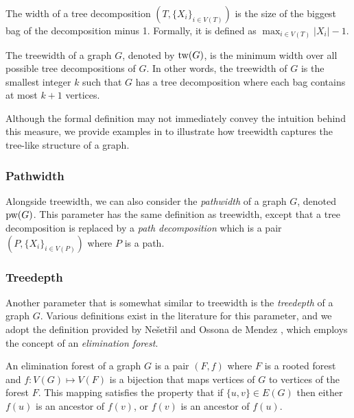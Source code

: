\begin{definition}
    The width of a tree decomposition $(T,\{X_i\}_{i \in V(T)})$ is the size of the biggest bag of the decomposition minus 1. Formally, it is defined as $\max_{i \in V(T)} |X_i| - 1$.
\end{definition}

\begin{definition}[treewidth]
    The treewidth of a graph $G$, denoted by $\text{tw}(G)$, is the minimum width over all possible tree decompositions of $G$. In other words, the treewidth of $G$ is the smallest integer $k$ such that $G$ has a tree decomposition where each bag contains at most $k+1$ vertices.
\end{definition}

Although the formal definition may not immediately convey the intuition behind this measure, we provide examples in  to illustrate how treewidth captures the tree-like structure of a graph.



\subsubsection*{Pathwidth}

Alongside treewidth, we can also consider the \textit{pathwidth} of a graph $G$, denoted $\text{pw}(G)$. This parameter has the same definition as treewidth, except that a tree decomposition is replaced by a \textit{path decomposition} which is a pair $(P, \{X_i\}_{i \in V(P)})$ where $P$ is a path.

\subsubsection*{Treedepth}

Another parameter that is somewhat similar to treewidth is the \textit{treedepth} of a graph $G$. Various definitions exist in the literature for this parameter, and we adopt the definition provided by Ne{\v{s}}et{\v{r}}il and Ossona de Mendez \cite{nevsetvril2006tree}, which employs the concept of an \textit{elimination forest}.

\begin{definition}
    An elimination forest of a graph $G$ is a pair $(F, f)$ where $F$ is a rooted forest and $f : V(G) \mapsto V(F)$ is a bijection that maps vertices of $G$ to vertices of the forest $F$. This mapping satisfies the property that if $\{u, v\} \in E(G)$ then either $f(u)$ is an ancestor of $f(v)$, or $f(v)$ is an ancestor of $f(u)$.
\end{definition}

